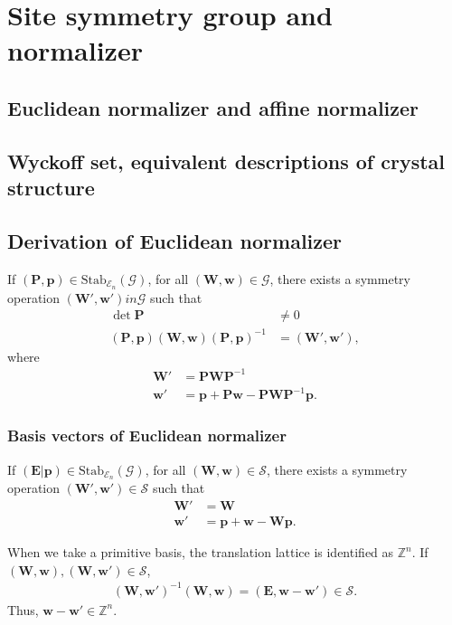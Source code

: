 \section{\label{sec:normalizer}Site symmetry group and normalizer}

\subsection{Euclidean normalizer and affine normalizer}

\subsection{Wyckoff set, equivalent descriptions of crystal structure}

\subsection{Derivation of Euclidean normalizer}

If $( \bm{P}, \bm{p} ) \in \mathrm{Stab}_{\mathcal{E}_{n}}(\mathcal{G})$, for all $(\bm{W}, \bm{w}) \in \mathcal{G}$, there exists a symmetry operation $(\bm{W}', \bm{w}') in \mathcal{G}$ such that
\begin{align}
    \det \bm{P} &\neq 0 \\
    (\bm{P}, \bm{p}) (\bm{W}, \bm{w}) (\bm{P}, \bm{p})^{-1} &= (\bm{W}', \bm{w}'),
\end{align}
where
\begin{align}
  \bm{W}' &= \bm{P} \bm{W} \bm{P}^{-1} \\
  \bm{w}' &= \bm{p} + \bm{Pw} - \bm{PW}\bm{P}^{-1}\bm{p}.
\end{align}

\subsubsection{Basis vectors of Euclidean normalizer}

If $( \bm{E} | \bm{p} ) \in \mathrm{Stab}_{\mathcal{E}_{n}}(\mathcal{G}) $, for all $(\bm{W}, \bm{w} ) \in \mathcal{S}$, there exists a symmetry operation $(\bm{W}', \bm{w}' ) \in \mathcal{S}$ such that
\begin{align}
  \bm{W}' &= \bm{W} \\
  \bm{w}' &= \bm{p} + \bm{w} - \bm{Wp}.
\end{align}

When we take a primitive basis, the translation lattice is identified as $\mathbb{Z}^{n}$.
If $(\bm{W}, \bm{w} ), (\bm{W}, \bm{w}') \in \mathcal{S}$,
\begin{align}
  (\bm{W}, \bm{w}')^{-1} (\bm{W}, \bm{w}) = (\bm{E}, \bm{w} - \bm{w}' ) \in \mathcal{S}.
\end{align}
Thus, $\mathbf{w} - \mathbf{w}' \in \mathbb{Z}^{n}$.

